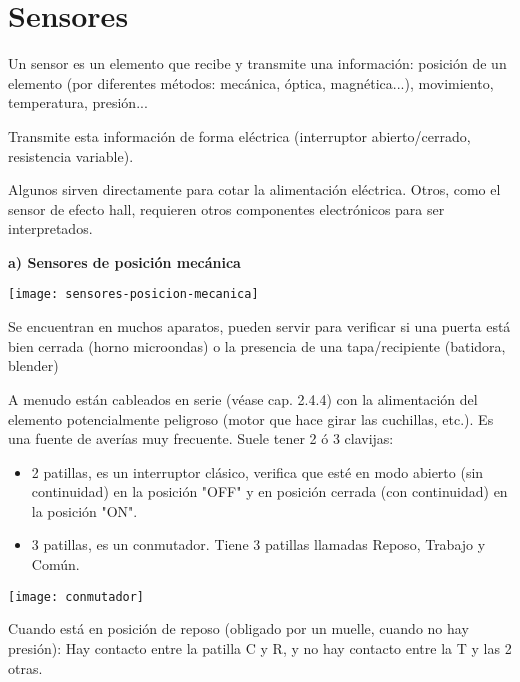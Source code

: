 \section{Sensores}

Un sensor es un elemento que recibe y transmite una información: posición de un elemento (por diferentes métodos: mecánica, óptica, magnética...), movimiento, temperatura, presión...

Transmite esta información de forma eléctrica (interruptor abierto/cerrado, resistencia variable).

Algunos sirven directamente para cotar la alimentación eléctrica.
Otros, como el sensor de efecto hall, requieren otros componentes electrónicos para ser interpretados.\\

\begin{center}
\textbf{a) Sensores de posición mecánica}
\end{center}
\begin{minipage}[h]{\textwidth}\vspace{0pt}
\texttt{[image: sensores-posicion-mecanica]}
\centering
\end{minipage}

Se encuentran en muchos aparatos, pueden servir para verificar si una puerta está bien cerrada (horno microondas) o la presencia de una tapa/recipiente (batidora, blender)
\newpage

A menudo están cableados en serie (véase cap. 2.4.4) con la alimentación del elemento potencialmente peligroso (motor que hace girar las cuchillas, etc.).
Es una fuente de averías muy frecuente. Suele tener 2 ó 3 clavijas:

\begin{itemize}
\item 2 patillas, es un interruptor clásico, verifica que esté en modo abierto (sin continuidad) en la posición "OFF" y en posición cerrada (con continuidad) en la posición "ON".
\item 3 patillas, es un conmutador. Tiene 3 patillas llamadas Reposo, Trabajo y Común.
\end{itemize}


\noindent\begin{minipage}[t]{0.35\textwidth}\vspace{0pt}
\texttt{[image: conmutador]}
\end{minipage}
\hfill%
\begin{minipage}[t]{0.6\textwidth}\vspace{\fill}
\vspace{\fill} %
Cuando está en posición de reposo (obligado por un muelle, cuando no hay presión): Hay contacto entre la patilla C y R, y no hay contacto entre la T y las 2 otras.\\
\vspace{\fill} %
\end{minipage}
\vspace{1em}


